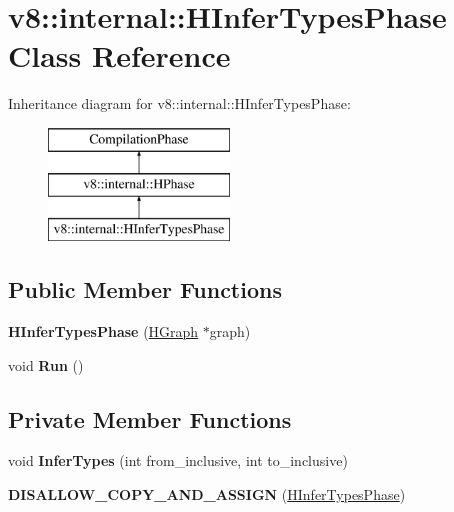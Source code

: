 \hypertarget{classv8_1_1internal_1_1_h_infer_types_phase}{}\section{v8\+:\+:internal\+:\+:H\+Infer\+Types\+Phase Class Reference}
\label{classv8_1_1internal_1_1_h_infer_types_phase}
Inheritance diagram for v8\+:\+:internal\+:\+:H\+Infer\+Types\+Phase\+:\begin{figure}[H]
\begin{center}
\leavevmode
\includegraphics[height=3.000000cm]{classv8_1_1internal_1_1_h_infer_types_phase}
\end{center}
\end{figure}
\subsection*{Public Member Functions}
\begin{DoxyCompactItemize}
\item 
{\bfseries H\+Infer\+Types\+Phase} (\hyperlink{classv8_1_1internal_1_1_h_graph}{H\+Graph} $\ast$graph)\hypertarget{classv8_1_1internal_1_1_h_infer_types_phase_aadd04d9c662b405789fd72d40baaeef0}{}\label{classv8_1_1internal_1_1_h_infer_types_phase_aadd04d9c662b405789fd72d40baaeef0}

\item 
void {\bfseries Run} ()\hypertarget{classv8_1_1internal_1_1_h_infer_types_phase_a0cc612b8e99ba3c1afbb220c660e94a0}{}\label{classv8_1_1internal_1_1_h_infer_types_phase_a0cc612b8e99ba3c1afbb220c660e94a0}

\end{DoxyCompactItemize}
\subsection*{Private Member Functions}
\begin{DoxyCompactItemize}
\item 
void {\bfseries Infer\+Types} (int from\+\_\+inclusive, int to\+\_\+inclusive)\hypertarget{classv8_1_1internal_1_1_h_infer_types_phase_a8bf22275db4980488e8fe234b910646b}{}\label{classv8_1_1internal_1_1_h_infer_types_phase_a8bf22275db4980488e8fe234b910646b}

\item 
{\bfseries D\+I\+S\+A\+L\+L\+O\+W\+\_\+\+C\+O\+P\+Y\+\_\+\+A\+N\+D\+\_\+\+A\+S\+S\+I\+GN} (\hyperlink{classv8_1_1internal_1_1_h_infer_types_phase}{H\+Infer\+Types\+Phase})\hypertarget{classv8_1_1internal_1_1_h_infer_types_phase_a8bef455bc5e262a3d7a7adb4c674e2d6}{}\label{classv8_1_1internal_1_1_h_infer_types_phase_a8bef455bc5e262a3d7a7adb4c674e2d6}

\end{DoxyCompactItemize}
